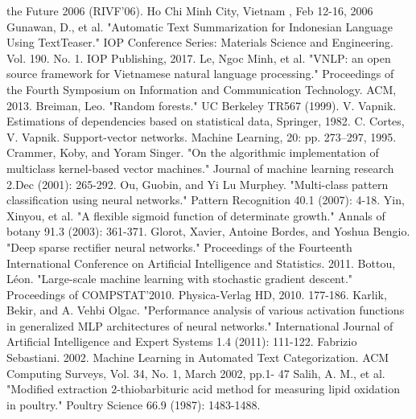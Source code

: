 \documentclass[conference]{IEEEtran}
\begin{document}
\begin{thebibliography}{1}
the Future 2006 (RIVF’06). Ho Chi Minh City, Vietnam , Feb 12-16,
2006
Gunawan, D., et al. "Automatic Text Summarization for Indonesian Language Using TextTeaser." IOP Conference Series: Materials Science and Engineering. Vol. 190. No. 1. IOP Publishing, 2017.
Le, Ngoc Minh, et al. "VNLP: an open source framework for Vietnamese natural language processing." Proceedings of the Fourth Symposium on Information and Communication Technology. ACM, 2013.
Breiman, Leo. "Random forests." UC Berkeley TR567 (1999).
V. Vapnik. Estimations of dependencies based on statistical data,
Springer, 1982.
C. Cortes, V. Vapnik. Support-vector networks. Machine Learning,
20: pp. 273–297, 1995.
Crammer, Koby, and Yoram Singer. "On the algorithmic implementation of multiclass kernel-based vector machines." Journal of machine learning research 2.Dec (2001): 265-292.
Ou, Guobin, and Yi Lu Murphey. "Multi-class pattern classification using neural networks." Pattern Recognition 40.1 (2007): 4-18.
Yin, Xinyou, et al. "A flexible sigmoid function of determinate growth." Annals of botany 91.3 (2003): 361-371.
Glorot, Xavier, Antoine Bordes, and Yoshua Bengio. "Deep sparse rectifier neural networks." Proceedings of the Fourteenth International Conference on Artificial Intelligence and Statistics. 2011.
Bottou, Léon. "Large-scale machine learning with stochastic gradient descent." Proceedings of COMPSTAT'2010. Physica-Verlag HD, 2010. 177-186.
Karlik, Bekir, and A. Vehbi Olgac. "Performance analysis of various activation functions in generalized MLP architectures of neural networks." International Journal of Artificial Intelligence and Expert Systems 1.4 (2011): 111-122.
Fabrizio Sebastiani. 2002. Machine Learning in Automated Text
Categorization. ACM Computing Surveys, Vol. 34, No. 1, March 2002,
pp.1- 47 
Salih, A. M., et al. "Modified extraction 2-thiobarbituric acid method for measuring lipid oxidation in poultry." Poultry Science 66.9 (1987): 1483-1488.
\end{thebibliography}


% 
\end{document}
